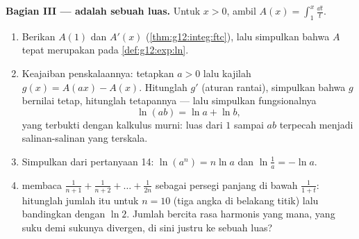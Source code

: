 \begin{problem}
\medskip
\noindent\textbf{Bagian III ---  adalah sebuah luas.}
Untuk $x > 0$, ambil
$A(x) = \displaystyle\int_1^x \frac{\dd t}{t}$.
\begin{enumerate}[resume]
  \item Berikan $A(1)$ dan $A'(x)$
        (\cref{thm:g12:integ:ftc}), lalu simpulkan bahwa $A$
        tepat merupakan  pada
        \cref{def:g12:exp:ln}.
  \item Keajaiban penskalaannya: tetapkan $a > 0$ lalu kajilah
        $g(x) = A(ax) - A(x)$. Hitunglah $g'$ (aturan rantai),
        simpulkan bahwa $g$ bernilai tetap, hitunglah tetapannya ---
        lalu simpulkan  fungsionalnya
        \[
        \ln(ab) = \ln a + \ln b ,
        \]
        yang terbukti dengan kalkulus murni: luas dari $1$ sampai $ab$
        terpecah menjadi salinan-salinan yang terskala.
  \item Simpulkan dari pertanyaan 14: $\ln(a^n) = n\ln a$ dan
        $\ln\frac1a = -\ln a$.
  \item {} membaca
        $\frac{1}{n+1} + \frac{1}{n+2} + \dots + \frac{1}{2n}$
        sebagai persegi panjang di bawah $\frac{1}{1 + t}$: hitunglah jumlah
        itu untuk $n = 10$ (tiga angka di belakang titik) lalu bandingkan dengan
        $\ln 2$. Jumlah bercita rasa harmonis yang mana, yang suku demi
        sukunya divergen, di sini justru  ke sebuah luas?
\end{enumerate}


\end{problem}
